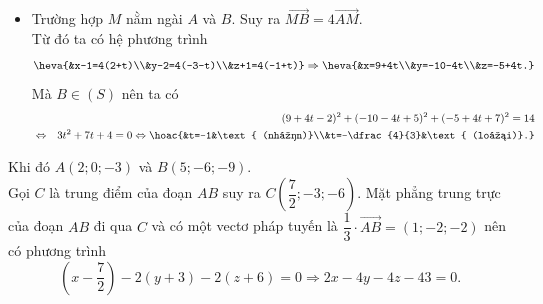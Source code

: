 \begin{ex}
{\begin{itemchoice}
\begin{itemize}
\begin{eqnarray*}
&\Leftrightarrow& 3t^2+10t+61=0\\
&\Rightarrow& \text{phương trình vô nghiệm.}
\end{eqnarray*}
Do đó không thoả mãn.
\item  Trường hợp $M$ nằm ngài $A$ và $B$. Suy ra $\overrightarrow{MB}=4\overrightarrow{AM}$.\\
Từ đó ta có hệ phương trình
\[\heva{&x-1=4(2+t)\\&y-2=4(-3-t)\\&z+1=4(-1+t)}\Rightarrow \heva{&x=9+4t\\&y=-10-4t\\&z=-5+4t.}\]
Mà $B\in(S)$ nên ta có
\allowdisplaybreaks
\begin{eqnarray*}
&&(9 + 4t - 2)^2 + (-10 - 4t + 5)^2 + (-5 + 4t + 7)^2  = 14\\
&\Leftrightarrow& 3t^2+7t+4=0
\Leftrightarrow\hoac{&t=-1&\text{ (nhận)}\\&t=-\dfrac{4}{3}&\text{ (loại)}.}
\end{eqnarray*}
\end{itemize}
Khi đó $A(2;0;-3)$ và $B(5;-6;-9)$.\\
Gọi $C$ là trung điểm của đoạn $AB$ suy ra $C\left(\dfrac{7}{2};-3;-6\right)$. Mặt phẳng trung trực của đoạn $AB$ đi qua $C$ và có một vectơ pháp tuyến là $\dfrac{1}{3}\cdot\overrightarrow{AB}=(1;-2;-2)$ nên có phương trình
\[\left(x-\dfrac{7}{2}\right)-2(y+3)-2(z+6)=0\Rightarrow 2x-4y-4z-43=0.\]
\end{itemchoice}
}
\end{ex}

